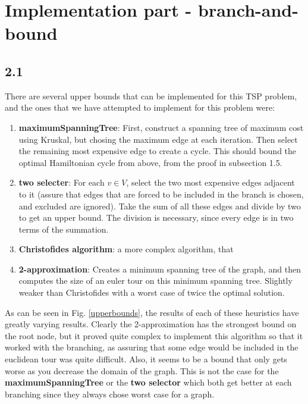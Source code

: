 \documentclass[12pt]{article}
\begin{document}
\section*{Implementation part - branch-and-bound}
\subsection*{2.1}

There are several upper bounds that can be implemented for this TSP problem, and the ones that we have attempted to implement for this problem were:
\begin{enumerate}
\item {\bf maximumSpanningTree}: First, construct a spanning tree of maximum cost using Kruskal, but chosing the maximum edge at each iteration. Then select the remaining most expensive edge to create a cycle. This should bound the optimal Hamiltonian cycle from above, from the proof in subsection 1.5.
\item {\bf two selecter}: For each $v\in V$, select the two most expensive edges adjacent to it (assure that edges that are forced to be included in the branch is chosen, and excluded are ignored). Take the sum of all these edges and divide by two to get an upper bound. The division is necessary, since every edge is in two terms of the summation.
\item {\bf Christofides algorithm}: a more complex algorithm, that 
\item {\bf 2-approximation}: Creates a minimum spanning tree of the graph, and then computes the size of an euler tour on this minimum spanning tree. Slightly weaker than Christofides with a worst case of twice the optimal solution.
\end{enumerate}

As can be seen in Fig. \ref{upperbounds}, the results of each of these heuristics have greatly varying results. Clearly the 2-approximation has the strongest bound on the root node, but it proved quite complex to implement this algorithm so that it worked with the branching, as assuring that some edge would be included in the euclidean tour was quite difficult. Also, it seems to be a bound that only gets worse as you decrease the domain of the graph. This is not the case for the {\bf maximumSpanningTree} or the {\bf two selector} which both get better at each branching since they always chose worst case for a graph.\\
\end{document}
